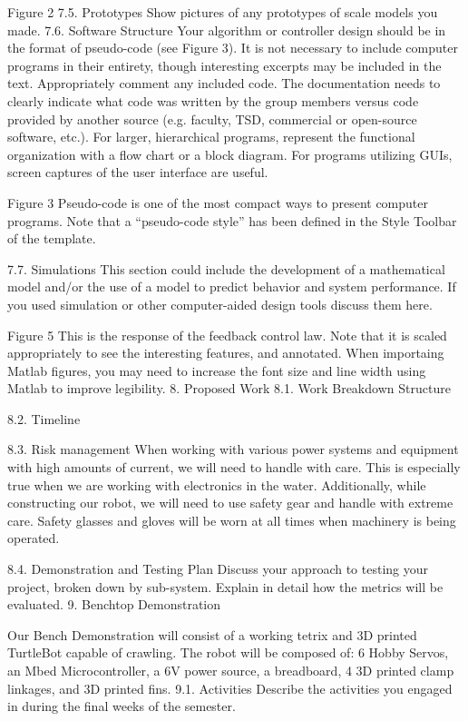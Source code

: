 Figure 2  
        7.5. Prototypes
Show pictures of any prototypes of scale models you made.
        7.6. Software Structure 
Your algorithm or controller design should be in the format of pseudo-code (see Figure 3). It is not necessary to include computer programs in their entirety, though interesting excerpts may be included in the text. Appropriately comment any included code. The documentation needs to clearly indicate what code was written by the group members versus code provided by another source (e.g. faculty, TSD, commercial or open-source software, etc.).  For larger, hierarchical programs, represent the functional organization with a flow chart or a block diagram.  For programs utilizing GUIs, screen captures of the user interface are useful.   

Figure 3  Pseudo-code is one of the most compact ways to present computer programs.   Note that a “pseudo-code style” has been defined in the Style Toolbar of the template.  

        7.7. Simulations
This section could include the development of a mathematical model and/or the use of a model to predict behavior and system performance.  If you used simulation or other computer-aided design tools discuss them here. 

Figure 5  This is the response of the feedback control law.   Note that it is scaled appropriately to see the interesting features, and annotated.   When importaing Matlab figures, you may need to increase the font size and line width using Matlab to improve legibility.
    8. Proposed Work
        8.1. Work Breakdown Structure

        8.2. Timeline

        8.3. Risk management
When working with various power systems and equipment with high amounts of current, we will need to handle with care. This is especially true when we are working with electronics in the water. Additionally, while constructing our robot, we will need to use safety gear and handle with extreme care. Safety glasses and gloves will be worn at all times when machinery is being operated. 

        8.4. Demonstration and Testing Plan
Discuss your approach to testing your project, broken down by sub-system.
Explain in detail how the metrics will be evaluated. 
    9. Benchtop Demonstration

Our Bench Demonstration will consist of a working tetrix and 3D printed TurtleBot capable of crawling. The robot will be composed of: 6 Hobby Servos, an Mbed Microcontroller, a 6V power source, a breadboard, 4 3D printed clamp linkages, and 3D printed fins. 
        9.1. Activities
Describe the activities you engaged in during the final weeks of the semester.

